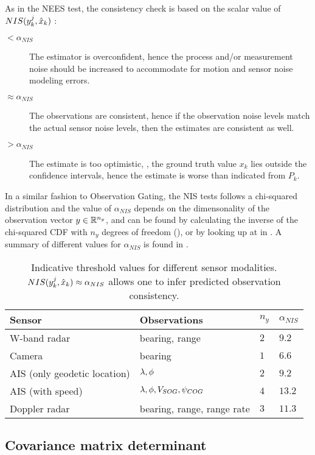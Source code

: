 As in the NEES test, the consistency check is based on the scalar value of $NIS({{y}}^j_k, \hat{x}_k)$ :
\begin{description}
	\item[$< \alpha_{NIS}$] The estimator is overconfident, hence the process and/or measurement noise should be increased to accommodate for motion and sensor noise modeling errors.
	\item[$ \approx \alpha_{NIS} $] The observations are consistent, hence if the observation noise levels match the actual sensor noise levels, then the estimates are consistent as well.
	\item[$> \alpha_{NIS}$] The estimate is too optimistic, \ie, the ground truth value $x_k$ lies outside the confidence intervals, hence the estimate is worse than indicated from $P_k$.
\end{description}
In a similar fashion to Observation Gating, the NIS tests follows a chi-squared distribution and the value of $\alpha_{NIS}$ depends on the dimensonality of the observation vector ${{y}} \in {\mathbb{R}}^{n_y}$, and can be found by calculating the inverse of the chi-squared CDF with $n_y$ degrees of freedom (), or by looking up at  in .  A summary of different values for $\alpha_{NIS}$ is found in .


\begin{table}[H]
	\centering
	\caption{Indicative threshold values for different sensor modalities. $NIS({{y}}^j_k, \hat{x}_k) \approx \alpha_{NIS}$ allows one to infer predicted observation consistency.}
	\label{tab:alphaNIS}
	\begin{tabular}{llll}
		\hline
		Sensor                       & Observations               & $n_y$ & $\alpha_{NIS}$ \\ \hline
		W-band radar                 & bearing, range             & $ 2 $  & $9.2$              \\
		Camera                       & bearing                    & $ 1 $     & $6.6$              \\
		AIS (only geodetic location) & ${\lambda}, {\phi}$                    & $ 2     $ & $ 9.2 $              \\
		AIS (with speed)             & ${\lambda}, {\phi}, {V}_{SOG},{\psi}_{COG}$                  & $ 4  $    & $ 13.2 $       \\
		Doppler radar                & bearing, range, range rate & $ 3  $    & $ 11.3  $             \\ \hline
	\end{tabular}
\end{table}

\subsection{Covariance matrix determinant}

